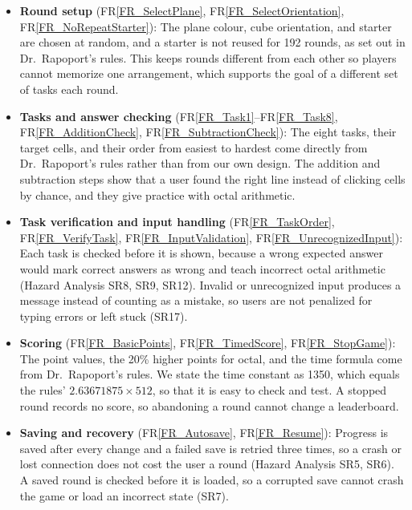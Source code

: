 \documentclass[12pt]{article}
\newcommand{\rref}[1]{FR\ref{#1}}
\begin{document}
\begin{itemize}
\item \textbf{Round setup} (\rref{FR_SelectPlane}, \rref{FR_SelectOrientation}, \rref{FR_NoRepeatStarter}): \newline
The plane colour, cube orientation, and starter are chosen at random, and a starter is not reused for 192 rounds, as set out in Dr.\ Rapoport's rules. This keeps rounds different from each other so players cannot memorize one arrangement, which supports the goal of a different set of tasks each round.

\item \textbf{Tasks and answer checking} (\rref{FR_Task1}--\rref{FR_Task8}, \rref{FR_AdditionCheck}, \rref{FR_SubtractionCheck}): \newline
The eight tasks, their target cells, and their order from easiest to hardest come directly from Dr.\ Rapoport's rules rather than from our own design. The addition and subtraction steps show that a user found the right line instead of clicking cells by chance, and they give practice with octal arithmetic.

\item \textbf{Task verification and input handling} (\rref{FR_TaskOrder}, \rref{FR_VerifyTask}, \rref{FR_InputValidation}, \rref{FR_UnrecognizedInput}): \newline
Each task is checked before it is shown, because a wrong expected answer would mark correct answers as wrong and teach incorrect octal arithmetic (Hazard Analysis SR8, SR9, SR12). Invalid or unrecognized input produces a message instead of counting as a mistake, so users are not penalized for typing errors or left stuck (SR17).

\item \textbf{Scoring} (\rref{FR_BasicPoints}, \rref{FR_TimedScore}, \rref{FR_StopGame}): \newline
The point values, the 20\% higher points for octal, and the time formula come from Dr.\ Rapoport's rules. We state the time constant as 1350, which equals the rules' $2.63671875 \times 512$, so that it is easy to check and test. A stopped round records no score, so abandoning a round cannot change a leaderboard.

\item \textbf{Saving and recovery} (\rref{FR_Autosave}, \rref{FR_Resume}): \newline
Progress is saved after every change and a failed save is retried three times, so a crash or lost connection does not cost the user a round (Hazard Analysis SR5, SR6). A saved round is checked before it is loaded, so a corrupted save cannot crash the game or load an incorrect state (SR7).


\end{itemize}
\end{document}

